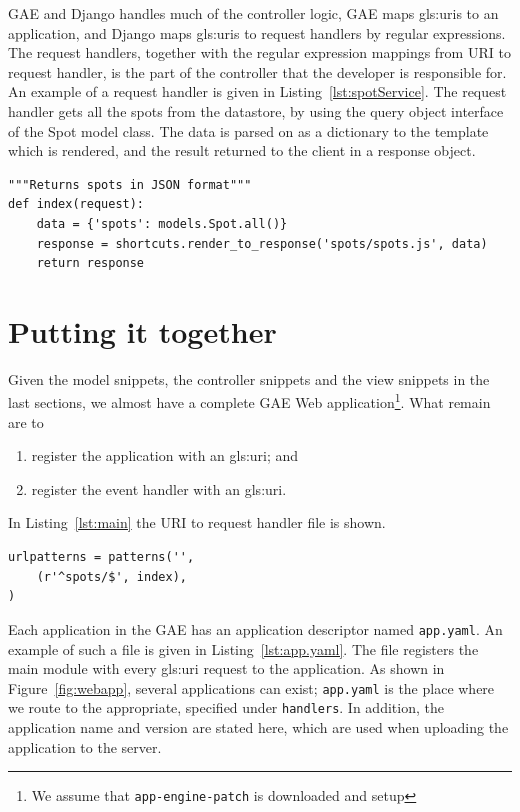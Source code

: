 GAE and Django handles much of the controller logic, GAE maps \gls{gls:uri}s to
an application, and Django maps \gls{gls:uri}s to request handlers by regular
expressions. The request handlers, together with the regular expression mappings
from URI to request handler, is the part of the controller that the developer is
responsible for. An example of a request handler is given in
Listing~\ref{lst:spotService}. The request handler gets all the spots from the
datastore, by using the query object interface of the Spot model class. The data
is parsed on as a dictionary to the template which is rendered, and the result
returned to the client in a response object.

\lstset{language=Python}
\begin{lstlisting}[caption=Spot service handler,label=lst:spotService]
"""Returns spots in JSON format"""
def index(request):
    data = {'spots': models.Spot.all()}
    response = shortcuts.render_to_response('spots/spots.js', data)
    return response
\end{lstlisting}

\section{Putting it together}
Given the model snippets, the controller snippets and the view snippets in the
last sections, we almost have a complete GAE Web application\footnote{We assume
that \verb|app-engine-patch| is downloaded and setup}. What remain are to%
%
\begin{enumerate}
  \item register the application with an \gls{gls:uri}; and
  \item register the event handler with an \gls{gls:uri}.
\end{enumerate}
%
In Listing~\ref{lst:main} the URI to request handler file is shown.

\begin{lstlisting}[caption=URI to request handler,label=lst:main]
urlpatterns = patterns('',
    (r'^spots/$', index),
)
\end{lstlisting}

Each application in the GAE has an application descriptor named
\verb|app.yaml|. An example of such a file is given in
Listing~\ref{lst:app.yaml}. The file registers the main module with every
\gls{gls:uri} request to the application. As shown in Figure~\ref{fig:webapp},
several applications can exist; \verb|app.yaml| is the place where we route to
the appropriate, specified under \verb|handlers|. In addition, the application
name and version are stated here, which are used when uploading the application to
the server.

